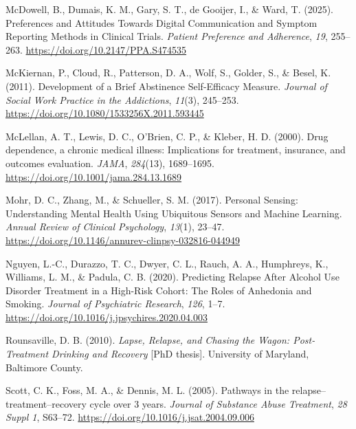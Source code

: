 \documentclass[
  letterpaper,
  DIV=11,
  numbers=noendperiod]{scrartcl}
\newlength{\cslhangindent}
\newenvironment{CSLReferences}[2] %
 {\begin{list}{}{%
  \setlength{\itemindent}{0pt}
  \setlength{\leftmargin}{0pt}
  \setlength{\parsep}{0pt}
  \ifodd #1
   \setlength{\leftmargin}{\cslhangindent}
   \setlength{\itemindent}{-1\cslhangindent}
  \fi
  \setlength{\itemsep}{#2\baselineskip}}}
 {\end{list}}
\begin{document}
\begin{CSLReferences}{1}{0}
McDowell, B., Dumais, K. M., Gary, S. T., de Gooijer, I., \& Ward, T.
(2025). Preferences and {Attitudes Towards Digital Communication} and
{Symptom Reporting Methods} in {Clinical Trials}. \emph{Patient
Preference and Adherence}, \emph{19}, 255--263.
\url{https://doi.org/10.2147/PPA.S474535}

McKiernan, P., Cloud, R., Patterson, D. A., Wolf, S., Golder, S., \&
Besel, K. (2011). Development of a {Brief Abstinence Self-Efficacy
Measure}. \emph{Journal of Social Work Practice in the Addictions},
\emph{11}(3), 245--253.
\url{https://doi.org/10.1080/1533256X.2011.593445}

McLellan, A. T., Lewis, D. C., O'Brien, C. P., \& Kleber, H. D. (2000).
Drug dependence, a chronic medical illness: Implications for treatment,
insurance, and outcomes evaluation. \emph{JAMA}, \emph{284}(13),
1689--1695. \url{https://doi.org/10.1001/jama.284.13.1689}

Mohr, D. C., Zhang, M., \& Schueller, S. M. (2017). Personal {Sensing}:
{Understanding Mental Health Using Ubiquitous Sensors} and {Machine
Learning}. \emph{Annual Review of Clinical Psychology}, \emph{13}(1),
23--47. \url{https://doi.org/10.1146/annurev-clinpsy-032816-044949}

Nguyen, L.-C., Durazzo, T. C., Dwyer, C. L., Rauch, A. A., Humphreys,
K., Williams, L. M., \& Padula, C. B. (2020). Predicting {Relapse After
Alcohol Use Disorder Treatment} in a {High-Risk Cohort}: {The Roles} of
{Anhedonia} and {Smoking}. \emph{Journal of Psychiatric Research},
\emph{126}, 1--7. \url{https://doi.org/10.1016/j.jpsychires.2020.04.003}

Rounsaville, D. B. (2010). \emph{Lapse, {Relapse}, and {Chasing} the
{Wagon}: {Post-Treatment Drinking} and {Recovery}} {[}PhD thesis{]}.
University of Maryland, Baltimore County.

Scott, C. K., Foss, M. A., \& Dennis, M. L. (2005). Pathways in the
relapse--treatment--recovery cycle over 3 years. \emph{Journal of
Substance Abuse Treatment}, \emph{28 Suppl 1}, S63--72.
\url{https://doi.org/10.1016/j.jsat.2004.09.006}


\end{CSLReferences}
\end{document}
